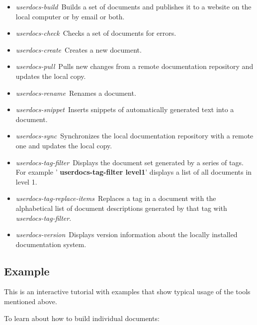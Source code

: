 \documentclass[12pt]{article}
\begin{document}
\begin{itemize}
\item {\it userdocs-build}\,\,\,Builds a set of documents and
  publishes it to a website on the local computer or by email or both.
\item {\it userdocs-check}\,\,\,Checks a set of documents for errors.
\item {\it userdocs-create}\,\,\,Creates a new document.
\item {\it userdocs-pull}\,\,\,Pulls new changes from a remote
  documentation repository and updates the local copy.
\item {\it userdocs-rename}\,\,\,Renames a document.
\item {\it userdocs-snippet}\,\,\,Inserts snippets of automatically
  generated text into a document.
\item {\it userdocs-sync}\,\,\,Synchronizes the local documentation
  repository with a remote one and updates the local copy.
\item {\it userdocs-tag-filter}\,\,\,Displays the document set
  generated by a series of tags.  For example '{\bf
    userdocs-tag-filter level1}' displays a list of all documents in
  level 1.
\item {\it userdocs-tag-replace-items}\,\,\,Replaces a tag in a
  document with the alphabetical list of document descriptions
  generated by that tag with {\it userdocs-tag-filter}.
\item {\it userdocs-version}\,\,\,Displays version information about
  the locally installed documentation system.
\end{itemize}


\subsection*{Example}

This is an interactive tutorial with examples that show typical usage
of the tools mentioned above.

To learn about how to build individual documents:
\end{document}
